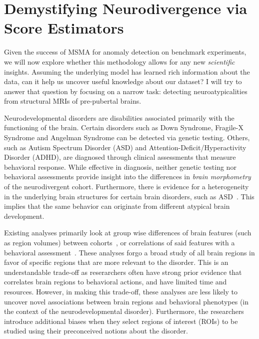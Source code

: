 \chapter{Demystifying Neurodivergence via Score Estimators }
\label{ch:demyst}

Given the success of MSMA for anomaly detection on benchmark experiments, we will now explore whether this methodology allows for any new \textit{scientific} insights.
Assuming the underlying model has learned rich information about the data, can it help us uncover useful knowledge about our dataset? I will try to answer that question by focusing on a narrow task: detecting neuroatypicalities from structural MRIs of pre-pubertal brains.

Neurodevelopmental disorders are disabilities associated primarily with the functioning of the brain. Certain disorders such as Down Syndrome, Fragile-X Syndrome and Angelman Syndrome can be detected via genetic testing. Others, such as Autism Spectrum Disorder (ASD) and Attention-Deficit/Hyperactivity Disorder (ADHD), are diagnosed through clinical assessments that measure behavioral response. While effective in diagnosis, neither genetic testing nor behavioral assessments provide insight into the differences in \textit{brain morphometry} of the neurodivergent cohort. Furthermore, there is evidence for a heterogeneity in the underlying brain structures for certain brain disorders, such as ASD~\cite{heteroasd}. This implies that the same behavior can originate from different atypical brain development.

Existing analyses primarily look at group wise differences of brain features (such as region volumes) between cohorts~\cite{giraultNeurodevelopmentAutismInfancy2020,hamnerPediatricBrainDevelopment2018}, or correlations of said features with a behavioral assessment~\cite{shenSubcorticalBrainDevelopment2022,brainsci12040439}.
These analyses forgo a broad study of all brain regions in favor of specific regions that are more relevant to the disorder. This is an understandable trade-off as reserarchers often have strong prior evidence that correlates brain regions to behavioral actions, and have limited time and resources. However, in making this trade-off, these analyses are less likely to uncover novel associations between brain regions and behavioral phenotypes (in the context of the neurodevelopmental disorder).
Furthermore, the researchers introduce additional biases when they select regions of interest (ROIs) to be studied using their preconceived notions about the disorder.

